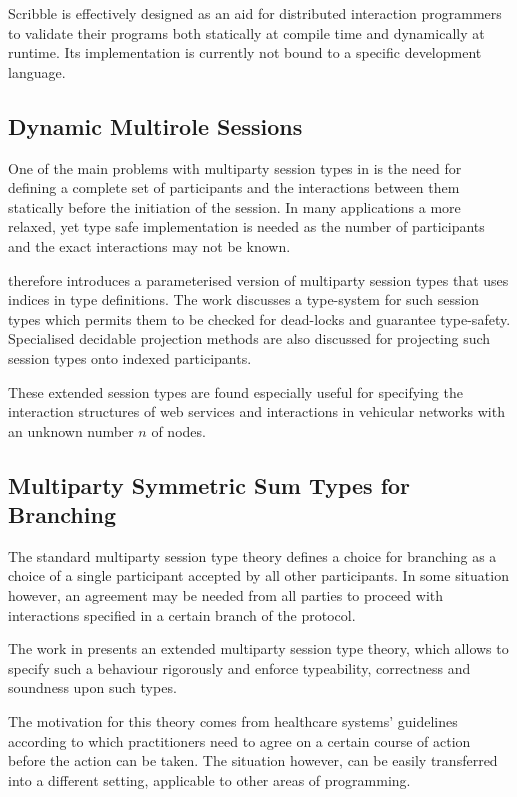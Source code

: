 Scribble is effectively designed as an aid for distributed interaction programmers to validate their programs both statically at compile time and dynamically at runtime. Its implementation is currently not bound to a specific development language.

\subsection*{Dynamic Multirole Sessions}

One of the main problems with multiparty session types in \cite{multiparty_sess_types} is the need for defining a complete set of participants and the interactions between them statically before the initiation of the session. In many applications a more relaxed, yet type safe implementation is needed as the number of participants and the exact interactions may not be known.

\cite{param_mpst} therefore introduces a parameterised version of multiparty session types that uses indices in type definitions. The work discusses a type-system for such session types which permits them to be checked for dead-locks and guarantee type-safety. Specialised decidable projection methods are also discussed for projecting such session types onto indexed participants.

These extended session types are found especially useful for specifying the interaction structures of web services and interactions in vehicular networks with an unknown number $n$ of nodes. 


\subsection*{Multiparty Symmetric Sum Types for Branching}

The standard multiparty session type theory defines a choice for branching as a choice of a single participant accepted by all other participants. In some situation however, an agreement may be needed from all parties to proceed with interactions specified in a certain branch of the protocol.

The work in \cite{symmetric_sum} presents an extended multiparty session type theory, which allows to specify such a behaviour rigorously and enforce typeability, correctness and soundness upon such types.

The motivation for this theory comes from healthcare systems' guidelines according to which practitioners need to agree on a certain course of action before the action can be taken. The situation however, can be easily transferred into a different setting, applicable to other areas of programming.

